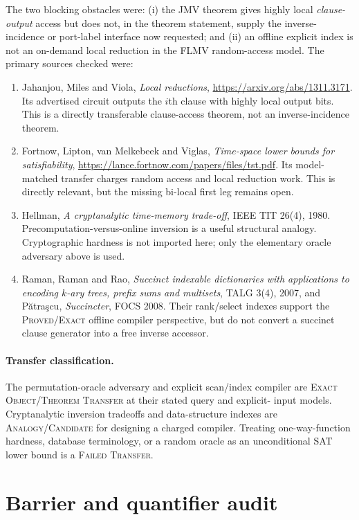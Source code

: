 \documentclass[11pt]{article}
\newcommand{\status}[1]{\textsc{#1}}
\begin{document}
The two blocking obstacles were: (i) the JMV theorem gives highly local
\emph{clause-output} access but does not, in the theorem statement, supply
the inverse-incidence or port-label interface now requested; and (ii) an
offline explicit index is not an on-demand local reduction in the FLMV
random-access model.  The primary sources checked were:
\begin{enumerate}[leftmargin=1.5em]
\item Jahanjou, Miles and Viola, \emph{Local reductions},
\url{https://arxiv.org/abs/1311.3171}.  Its advertised circuit outputs the
$i$th clause with highly local output bits.  This is a directly transferable
clause-access theorem, not an inverse-incidence theorem.
\item Fortnow, Lipton, van Melkebeek and Viglas, \emph{Time-space lower
bounds for satisfiability},
\url{https://lance.fortnow.com/papers/files/tst.pdf}.  Its model-matched
transfer charges random access and local reduction work.  This is directly
relevant, but the missing bi-local first leg remains open.
\item Hellman, \emph{A cryptanalytic time-memory trade-off}, IEEE TIT 26(4),
1980.  Precomputation-versus-online inversion is a useful structural analogy.
Cryptographic hardness is not imported here; only the elementary oracle
adversary above is used.
\item Raman, Raman and Rao, \emph{Succinct indexable dictionaries with
applications to encoding $k$-ary trees, prefix sums and multisets}, TALG
3(4), 2007, and P\u{a}tra\c{s}cu,
\emph{Succincter}, FOCS 2008.  Their rank/select indexes support the
\status{Proved/Exact} offline compiler perspective, but do not convert a
succinct clause generator into a free inverse accessor.
\end{enumerate}

\paragraph{Transfer classification.}
The permutation-oracle adversary and explicit scan/index compiler are
\status{Exact Object/Theorem Transfer} at their stated query and explicit-
input models.  Cryptanalytic inversion tradeoffs and data-structure indexes
are \status{Analogy/Candidate} for designing a charged compiler.  Treating
one-way-function hardness, database terminology, or a random oracle as an
unconditional SAT lower bound is a \status{Failed Transfer}.

\section{Barrier and quantifier audit}
\end{document}
